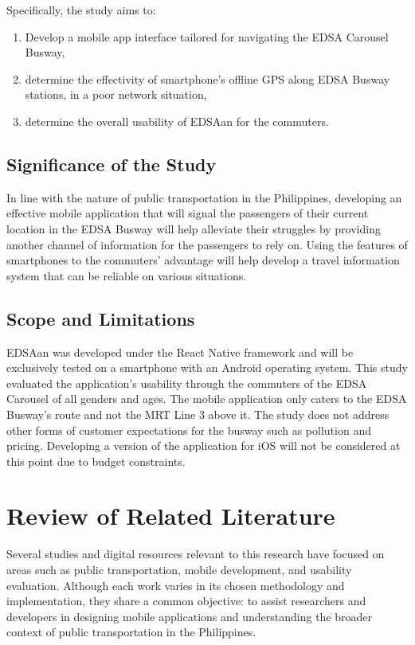 \documentclass[journal]{./IEEE/IEEEtran}
\begin{document}
Specifically, the study aims to:
\begin{enumerate}
    \item Develop a mobile app interface tailored for navigating the EDSA Carousel Busway,
    \item determine the effectivity of smartphone’s offline GPS along EDSA Busway stations, in a poor network situation,
    \item determine the overall usability of EDSAan for the commuters.
\end{enumerate}

\newpage

\subsection{Significance of the Study}
In line with the nature of public transportation in the Philippines, developing an effective mobile application that will signal the passengers of their current location in the EDSA Busway will help alleviate their struggles by providing another channel of information for the passengers to rely on. Using the features of smartphones to the commuters’ advantage will help develop a travel information system that can be reliable on various situations. 


\subsection{Scope and Limitations}
EDSAan was developed under the React Native framework and will be exclusively tested on a smartphone with an Android operating system. This study evaluated the application’s usability through the commuters of the EDSA Carousel of all genders and ages.
The mobile application only caters to the EDSA Busway’s route and not the MRT Line 3 above it. The study does not address other forms of customer expectations for the busway such as pollution and pricing. Developing a version of the application for iOS will not be considered at this point due to budget constraints.




\section{Review of Related Literature}
Several studies and digital resources relevant to this research have focused on areas such as public transportation, mobile development, and usability evaluation. Although each work varies in its chosen methodology and implementation, they share a common objective: to assist researchers and developers in designing mobile applications and understanding the broader context of public transportation in the Philippines.
\end{document}
